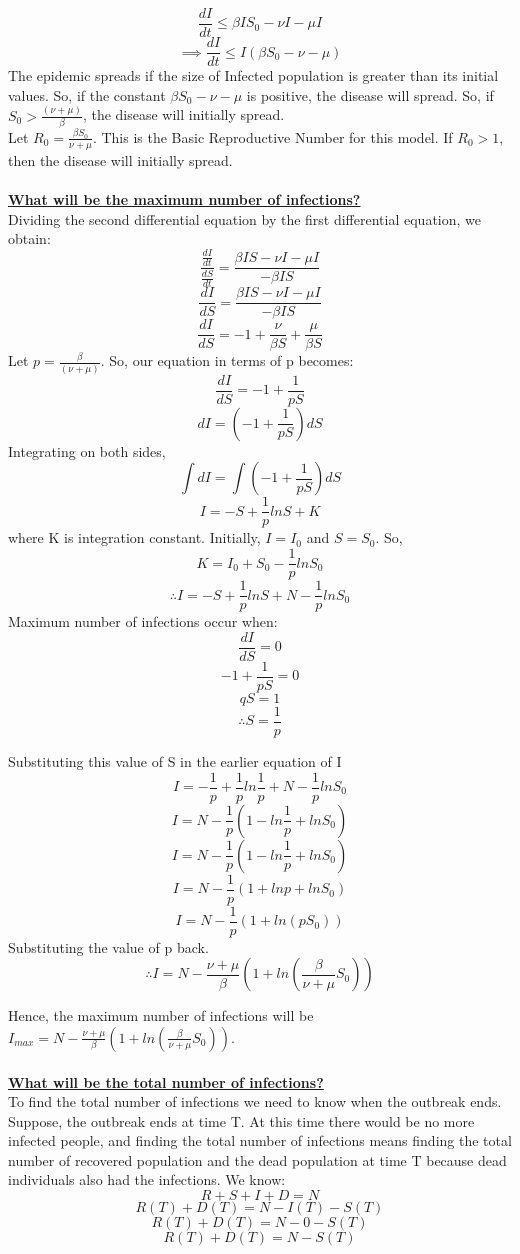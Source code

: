 \documentclass[11pt]{article}
\theoremstyle{definition}
\begin{document}
$$\frac{dI}{dt} \leq \beta IS_{0} - \nu I -\mu I $$
$$\implies \frac{dI}{dt} \leq I(\beta S_{0} - \nu -\mu )$$
The epidemic spreads if the size of Infected population is greater than its initial values. So, if the constant $\beta S_{0} - \nu -\mu $ is positive, the disease will spread. So, if $S_0 > \frac{(\nu + \mu) }{\beta}$, the disease will initially spread. \\
Let $R_0 = \frac{\beta S_0}{\nu + \mu}$. This is the Basic Reproductive Number for this model. If $R_0> 1$, then the disease will initially spread.\\
\\
\textbf{\underline{What will be the maximum number of infections?}}\\
Dividing the second differential equation by the first differential equation, we obtain:
$$\frac{\frac{dI}{dt}}{\frac{dS}{dt}}= \frac{\beta I S-\nu I -\mu I }{-\beta I S}$$
$$\frac{dI}{dS}= \frac{\beta I S-\nu I -\mu I }{-\beta I S}$$
$$\frac{dI}{dS}=-1 + \frac{\nu }{\beta S} + \frac{\mu }{\beta S}$$
Let $p = \frac{\beta}{(\nu+\mu)}$. So, our equation in terms of p becomes:
$$\frac{dI}{dS}=-1 + \frac{1 }{p S}$$
$$dI = (-1+\frac{1}{pS}) dS$$
Integrating on both sides,
$$\int dI = \int (-1+\frac{1}{pS}) dS$$
$$I = -S + \frac{1}{p}lnS+K$$
where K is integration constant. Initially, $I = I_{0}$ and $S = S_{0}$. So, 
$$K = I_0 + S_0 -\frac{1}{p}lnS_0$$
$$\therefore I = -S + \frac{1}{p}lnS+ N -\frac{1}{p}lnS_0$$
Maximum number of infections occur when:
$$\frac{dI}{dS}=0$$
$$-1+\frac{1}{pS}=0$$
$$qS=1$$
$$\therefore S = \frac{1}{p}$$

Substituting this value of S in the earlier equation of I
$$I = -\frac{1}{p} + \frac{1}{p}ln\frac{1}{p}+ N -\frac{1}{p}lnS_0$$
$$I = N -\frac{1}{p} (1-ln\frac{1}{p}+lnS_0)$$
$$I = N -\frac{1}{p} (1-ln\frac{1}{p}+lnS_0)$$
$$I = N -\frac{1}{p} (1+ln{p}+lnS_0)$$
$$I = N -\frac{1}{p} (1+ln{(pS_0)})$$
Substituting the value of p back.
$$\therefore I = N -\frac{\nu + \mu}{\beta} (1+ln{(\frac{\beta }{\nu + \mu}S_0)})$$


Hence, the maximum number of infections will be $I_{max} = N -\frac{\nu + \mu}{\beta} (1+ln{(\frac{\beta }{\nu + \mu}S_0)})$.\\
\\
\textbf{\underline{What will be the total number of infections?}}\\
To find the total number of infections we need to know when the outbreak ends. Suppose, the outbreak ends at time T. At this time there would be no more infected people, and finding the total number of infections means finding the total number of recovered population and the dead population at time T because dead individuals also had the infections.
We know: 
$$R+S+I+D = N$$
$$R(T)+D(T) = N-I(T)-S(T)$$
$$R(T)+D(T) = N-0-S(T)$$
$$R(T)+D(T) = N-S(T)$$
\end{document}
